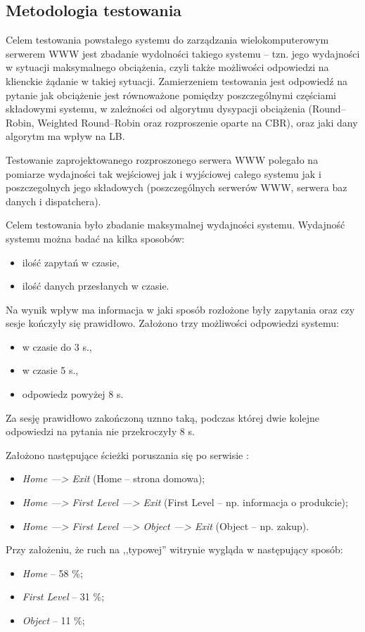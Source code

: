 \subsection{Metodologia testowania}

Celem testowania powstałego systemu do zarządzania wielokomputerowym serwerem WWW
jest zbadanie wydolności takiego systemu -- tzn. jego wydajności w sytuacji
maksymalnego obciążenia, czyli także możliwości odpowiedzi na klienckie 
żądanie w takiej sytuacji. Zamierzeniem testowania jest odpowiedź na 
pytanie jak obciążenie jest równoważone pomiędzy poszczególnymi częściami
składowymi systemu, w zależności od algorytmu dysypacji obciążenia
(Round--Robin, Weighted Round--Robin oraz rozproszenie oparte na CBR), oraz
jaki dany algorytm ma wpływ na LB.

Testowanie zaprojektowanego rozproszonego serwera WWW polegało na pomiarze
wydajności tak wejściowej jak i wyjściowej całego systemu jak i poszczegolnych
jego składowych (poszczególnych serwerów WWW, serwera baz danych i dispatchera).

Celem testowania było zbadanie maksymalnej wydajności systemu. Wydajność systemu można badać na kilka sposobów:
\begin{itemize}
\item ilość zapytań w czasie,
\item ilość danych przesłanych w czasie.
\end{itemize}

Na wynik wpływ ma informacja w jaki sposób rozłożone były zapytania oraz czy sesje kończyły się prawidłowo. Założono trzy 
możliwości odpowiedzi systemu:
\begin{itemize}
\item w czasie do 3 s.,
\item w czasie 5 s.,
\item odpowiedz powyżej 8 s.
\end{itemize}

Za sesję prawidłowo zakończoną uznno taką, podczas której dwie kolejne odpowiedzi na pytania nie przekroczyły 8 s.

Założono następujące ścieżki poruszania się po serwisie \cite{savoia3}:
\begin{itemize}
\item \emph{Home ---> Exit} (Home -- strona domowa);
\item \emph{Home ---> First Level ---> Exit} (First Level -- np. informacja o produkcie);
\item \emph{Home ---> First Level ---> Object ---> Exit} (Object -- np. zakup).
\end{itemize}
Przy założeniu, że ruch na ,,typowej'' witrynie \cite{savoia1,savoia2,savoia3} wygląda w następujący sposób:
\begin{itemize}
\item \emph{Home} -- 58 \%;
\item \emph{First Level} -- 31 \%;
\item \emph{Object} -- 11 \%;
\end{itemize}

